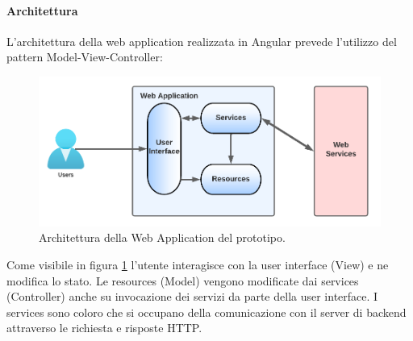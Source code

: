\paragraph{Architettura}
L'architettura della web application realizzata in Angular prevede l'utilizzo del pattern Model-View-Controller:
\FloatBarrier
\begin{figure}[!ht]
\centering
\includegraphics[width=1\linewidth]{immagini/angular_architecture.pdf}
\caption{Architettura della Web Application del prototipo.}
\label{angular-architecture}
\end{figure}
\FloatBarrier
Come visibile in figura \ref{angular-architecture} l'utente interagisce con la user interface (View) e ne modifica lo stato. Le resources (Model) vengono modificate dai services (Controller) anche su invocazione dei servizi da parte della user interface. I services sono coloro che si occupano della comunicazione con il server di backend attraverso le richiesta e risposte HTTP.

